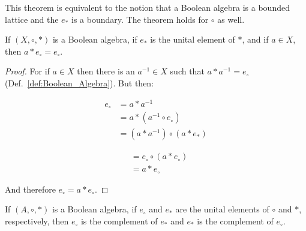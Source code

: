     This theorem is equivalent to the notion that a Boolean algebra is a
    bounded lattice and the $e_{*}$ is a boundary. The
    theorem holds for $\circ$ as well.
    \begin{theorem}
        \label{thm:Bool_Alg_Boundary_of_Star}%
        If $(X,\circ,*)$ is a Boolean algebra, if $e_{*}$ is the unital
        element of $*$, and if $a\in{X}$, then $a*{e}_{\circ}=e_{\circ}$.
    \end{theorem}
    \begin{proof}
        For if $a\in{X}$ then there is an $a^{\minus{1}}\in{X}$ such that
        $a*{a}^{\minus{1}}=e_{\circ}$ (Def.~\ref{def:Boolean_Algebra}).
        But then:
        \par\vspace{-2.5ex}
        \begin{minipage}[t]{0.51\textwidth}
            \centering
            \begin{align}
                e_{\circ}&=a*{a}^{\minus{1}}
                \tag{Complement}\\
                &=a*(a^{\minus{1}}\circ{e}_{\circ})
                \tag{Identity}\\
                &=(a*a^{\minus{1}})\circ(a*e_{*})
                \tag{Distributivity}
            \end{align}
        \end{minipage}
        \hfill
        \begin{minipage}[t]{0.47\textwidth}
            \centering
            \begin{align}
                &=e_{\circ}\circ(a*e_{\circ})
                \tag{Complement}\\
                &=a*e_{\circ}
                \tag{Identity}
            \end{align}
        \end{minipage}
        \par\vspace{2.5ex}
        And therefore $e_{\circ}=a*e_{\circ}$.
    \end{proof}
    \begin{theorem}
        If $(A,\circ,*)$ is a Boolean algebra, if $e_{\circ}$ and $e_{*}$
        are the unital elements of $\circ$ and $*$, respectively, then
        $e_{\circ}$ is the complement of $e_{*}$ and $e_{*}$ is the
        complement of $e_{\circ}$.
    \end{theorem}
